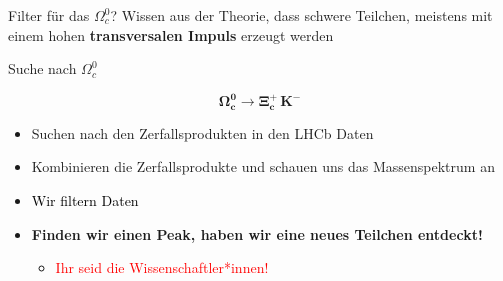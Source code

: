 \begin{frame}{Filter für das $\Omega_c^0$?}
Wissen aus der Theorie, dass schwere Teilchen, meistens mit einem hohen \textbf{transversalen Impuls} erzeugt werden
\begin{center}
\end{center}
\end{frame}
\begin{frame}{Suche nach $\Omega_c^0$}

  \begin{center} \vspace{-1cm}
 \Large    \[\mathbf{\Omega_c^0 \rightarrow \Xi_c^+ \, K^-}\]
 \end{center}
   \begin{spacing}{1.5}
       
  
    \begin{itemize}    \item[\ding{202}] Suchen nach den Zerfallsprodukten in den LHCb Daten 
    \item[\ding{203}]Kombinieren die Zerfallsprodukte und schauen uns das Massenspektrum an   
        \item[\ding{204}]  \textcolor{black}{Wir filtern Daten}
    \item [\ding{205}] \textcolor{back}{\textbf{Finden wir einen Peak, haben wir eine neues Teilchen entdeckt! }}
    \begin{itemize} \pause
        \item [\ding{43}] \textcolor{red }{Ihr seid die Wissenschaftler*innen!}
    \end{itemize}
\end{itemize}
 \end{spacing}

\end{frame}
